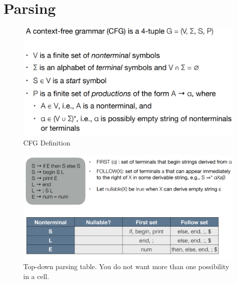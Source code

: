 \section{Parsing}

\begin{figure}[h]
    \centering
    \includegraphics[scale=0.35]{assets/cfg_def.png}
    \caption{CFG Definition}
    \label{fig:cfg}
\end{figure}

\begin{figure}[h]
    \centering
    \includegraphics[scale=0.35]{assets/top-down_parsing_table.png}
    \caption{Top-down parsing table. You do not want more than one possibility in a cell.}
    \label{fig:top-down}
\end{figure}

